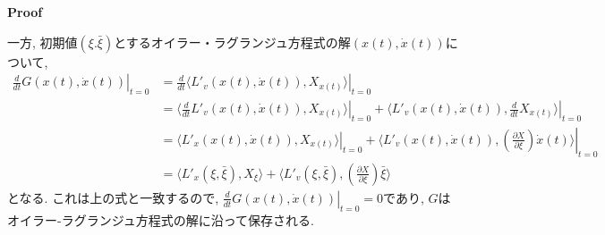 \documentclass[a4paper]{ujarticle}
\makeatletter
\numberwithin{equation}{section}
\theoremstyle{definition}
\renewenvironment{proof}[1][Proof]{\par
  \pushQED{\qed}%
  \normalfont \topsep6\p@\@plus6\p@\relax
  \trivlist
  \item\relax
  {\bfseries
  #1\@addpunct{.}}\hspace\labelsep\ignorespaces
}{%
  \popQED\endtrivlist\@endpefalse
}
\makeatother
\begin{document}
\begin{proof}
        一方, 初期値$(\xi. \bar{\xi})$とするオイラー・ラグランジュ方程式の解$(x(t), \dot{x}(t))$について,
        \begin{align}
            \left. \frac{d}{d t} G(x(t), \dot{x}(t))\right|_{t = 0}
            &= \left. \frac{d}{d t} \langle L'_v(x(t), \dot{x}(t)), X_{x(t)}\rangle\right|_{t = 0} \\
            &= \left.\langle \frac{d}{d t} L'_v(x(t), \dot{x}(t)), X_{x(t)}\rangle\right|_{t = 0} + \left.\langle L'_v(x(t), \dot{x}(t)), \frac{d}{d t}  X_{x(t)}\rangle \right|_{t = 0}\\
            &= \left.\langle L'_{x}(x(t), \dot{x}(t)), X_{x(t)}\rangle\right|_{t = 0} + \left.\langle L'_v(x(t), \dot{x}(t)), \left(\frac{\partial X}{\partial \xi}\right) \dot{x}(t)\rangle \right|_{t = 0}\\
            &= \langle L'_{x}(\xi, \bar{\xi}), X_{\xi}\rangle + \langle L'_v(\xi, \bar{\xi}), \left(\frac{\partial X}{\partial \xi}\right) \bar{\xi}\rangle
        \end{align}
        となる. これは上の式と一致するので, $\displaystyle \left. \frac{d}{d t} G(x(t), \dot{x}(t))\right|_{t = 0} = 0$であり, 
        $G$はオイラー-ラグランジュ方程式の解に沿って保存される.
    \end{proof}
\end{document}
